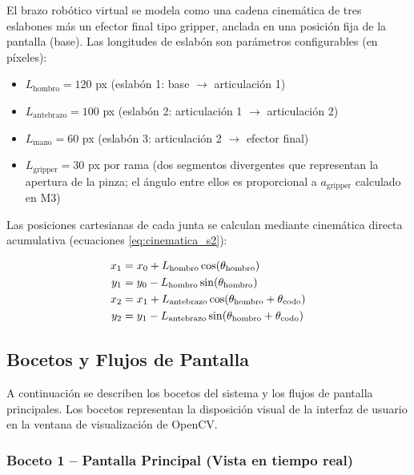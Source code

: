 El brazo robótico virtual se modela como una cadena cinemática de tres
eslabones más un efector final tipo gripper, anclada en una posición
fija de la pantalla (base). Las longitudes de eslabón son parámetros
configurables (en píxeles):

\begin{itemize}[leftmargin=1.5em]
    \item $L_{\text{hombro}} = 120$ px (eslabón 1: base $\to$
          articulación 1)
    \item $L_{\text{antebrazo}} = 100$ px (eslabón 2: articulación 1
          $\to$ articulación 2)
    \item $L_{\text{mano}} = 60$ px (eslabón 3: articulación 2
          $\to$ efector final)
    \item $L_{\text{gripper}} = 30$ px por rama (dos segmentos
          divergentes que representan la apertura de la pinza;
          el ángulo entre ellos es proporcional a
          $a_{\text{gripper}}$ calculado en M3)
\end{itemize}

Las posiciones cartesianas de cada junta se calculan mediante cinemática
directa acumulativa (ecuaciones \ref{eq:cinematica_s2}):

\begin{align}
  x_1 &= x_0 + L_{\text{hombro}}\cos(\theta_{\text{hombro}})
  \notag \\
  y_1 &= y_0 - L_{\text{hombro}}\sin(\theta_{\text{hombro}})
  \notag \\
  x_2 &= x_1 + L_{\text{antebrazo}}
               \cos(\theta_{\text{hombro}} + \theta_{\text{codo}})
  \notag \\
  y_2 &= y_1 - L_{\text{antebrazo}}
               \sin(\theta_{\text{hombro}} + \theta_{\text{codo}})
  \label{eq:cinematica_s2}
\end{align}

\subsection{Bocetos y Flujos de Pantalla}

A continuación se describen los bocetos del sistema y los flujos de
pantalla principales. Los bocetos representan la disposición visual de
la interfaz de usuario en la ventana de visualización de OpenCV.

\subsubsection*{Boceto 1 -- Pantalla Principal (Vista en tiempo real)}

